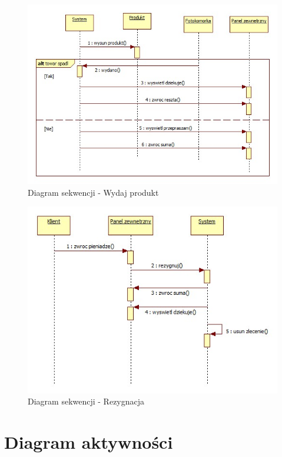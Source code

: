 \documentclass[a4paper, 11pt]{article}
\begin{document}
\begin{figure}[H]
\centerline{\includegraphics[scale=0.8]{../Diagrams/wydajProdukt}}
\caption{Diagram sekwencji - Wydaj produkt}
\end{figure}

\begin{figure}[H]
\centerline{\includegraphics[scale=0.9]{../Diagrams/rezygnacja}}
\caption{Diagram sekwencji - Rezygnacja}
\end{figure}
\section{Diagram aktywności}
\end{document}
